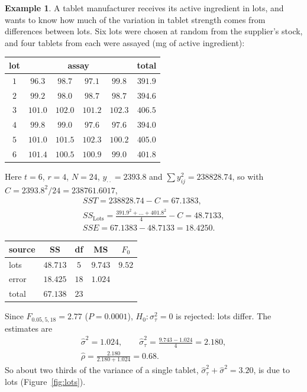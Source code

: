\documentclass[11pt,a4paper]{article}
\numberwithin{equation}{section}
\theoremstyle{definition}
\newtheorem{exa}[thm]{Example}
\begin{document}
\begin{exa}\label{exa:lots}
A tablet manufacturer receives its active ingredient in lots, and wants to know how much of the variation in tablet strength comes from differences
between lots. Six lots were chosen at random from the supplier's stock, and four tablets from each were assayed (mg of active ingredient):
\begin{center}
\begin{tabular}{c|cccc|c}
lot & \multicolumn{4}{c|}{assay} & total \\
\hline
$1$ & $96.3$ & $98.7$ & $97.1$ & $99.8$ & $391.9$ \\
$2$ & $99.2$ & $98.0$ & $98.7$ & $98.7$ & $394.6$ \\
$3$ & $101.0$ & $102.0$ & $101.2$ & $102.3$ & $406.5$ \\
$4$ & $99.8$ & $99.0$ & $97.6$ & $97.6$ & $394.0$ \\
$5$ & $101.0$ & $101.5$ & $102.3$ & $100.2$ & $405.0$ \\
$6$ & $101.4$ & $100.5$ & $100.9$ & $99.0$ & $401.8$
\end{tabular}
\end{center}
Here $t = 6$, $r = 4$, $N = 24$, $y_{\cdot\cdot} = 2393.8$ and $\sum y_{ij}^2 = 238828.74$, so with $C = 2393.8^2/24 = 238761.6017$,
\begin{gather*}
SST = 238828.74 - C = 67.1383 , \\
SS_{\mathrm{Lots}} = \frac{391.9^2 + \dots + 401.8^2}4 - C = 48.7133 , \\
SSE = 67.1383 - 48.7133 = 18.4250 .
\end{gather*}
\begin{center}
\begin{tabular}{l|cccc}
source & SS & df & MS & $F_0$ \\
\hline
lots & $48.713$ & $5$ & $9.743$ & $9.52$ \\
error & $18.425$ & $18$ & $1.024$ & \\
\hline
total & $67.138$ & $23$ & &
\end{tabular}
\end{center}
Since $F_{0.05, 5, 18} = 2.77$ ($P = 0.0001$), $H_0 : \sigma^2_\tau = 0$ is rejected: lots differ. The estimates are
\begin{gather*}
\hat\sigma^2 = 1.024 , \qquad \hat\sigma^2_\tau = \frac{9.743 - 1.024}4 = 2.180 , \\
\hat\rho = \frac{2.180}{2.180 + 1.024} = 0.68 .
\end{gather*}
So about two thirds of the variance of a single tablet, $\hat\sigma^2_\tau + \hat\sigma^2 = 3.20$, is due to lots (Figure~\ref{fig:lots}).


\end{exa}
\end{document}

